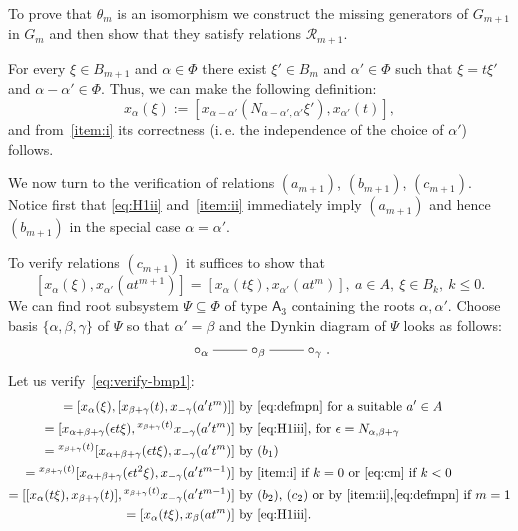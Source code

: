 \documentclass[oneside, 10pt]{amsart}
\newcommand{\RR}[1]{\mathcal{R}_{#1}}
\theoremstyle{remark}
\begin{document}
To prove that $\theta_m$ is an isomorphism we construct the missing generators of $G_{m+1}$ in $G_m$ and then show that they satisfy relations $\RR{m+1}$.

For every $\xi \in B_{m+1}$ and $\alpha\in \Phi$ there exist $\xi' \in B_m$ and $\alpha'\in \Phi$ such that $\xi = t\xi'$ and $\alpha-\alpha'\in\Phi$.
Thus, we can make the following definition:
\begin{equation} \label{eq:defmpn} x_\alpha(\xi) := [x_{\alpha-\alpha'}(N_{\alpha-\alpha',\alpha'} \xi'), x_{\alpha'}(t)],\end{equation} 
and from~\eqref{item:i} its correctness (i.\,e. the independence of the choice of $\alpha'$) follows.

We now turn to the verification of relations $(a_{m+1})$, $(b_{m+1})$, $(c_{m+1})$.
Notice first that \eqref{eq:H1ii} and~\eqref{item:ii} immediately imply $(a_{m+1})$ and hence $(b_{m+1})$ in the special case $\alpha=\alpha'$.

To verify relations $(c_{m+1})$ it suffices to show that
\begin{equation}
\label{eq:verify-bmp1} [x_\alpha(\xi), x_{\alpha'}(at^{m+1})] = [x_\alpha(t\xi), x_{\alpha'}(at^m)],\ a \in A,\ \xi \in B_k,\ k\leq 0.
\end{equation}
We can find root subsystem $\Psi \subseteq \Phi$ of type $\mathsf{A}_3$ containing the roots $\alpha, \alpha'$.
Choose basis $\{\alpha,\beta,\gamma\}$ of $\Psi$ so that $\alpha'=\beta$ and the Dynkin diagram of $\Psi$ looks as follows:
\begin{equation}\label{eq:diagA3} \xymatrix{\circ_\alpha \ar@{-}[r] & \circ_\beta \ar@{-}[r] & \circ_\gamma}.\end{equation}
Let us verify~\eqref{eq:verify-bmp1}:
\begin{align*}
   [x_\alpha(\xi), x_\beta(at^{m+1})] = [x_\alpha(\xi), [x_{\beta + \gamma}(t), x_{-\gamma}(a't^m)]]&  \text{ by~\eqref{eq:defmpn} for a suitable $a'\in A$} \\ 
 = [x_{\alpha+\beta+\gamma}(\epsilon t\xi), {}^{x_{\beta+\gamma}(t)}x_{-\gamma}(a't^m)]             &  \text{ by~\eqref{eq:H1iii}, for $\epsilon=N_{\alpha, \beta+\gamma}$} \\
 = {}^{x_{\beta+\gamma}(t)}[x_{\alpha+\beta+\gamma}(\epsilon t\xi), x_{-\gamma}(a't^m)]             &  \text{ by $(b_1)$} \\
 = {}^{x_{\beta+\gamma}(t)}[x_{\alpha+\beta+\gamma}(\epsilon t^2\xi), x_{-\gamma}(a't^{m-1})]       &  \text{ by~\eqref{item:i} if $k=0$ or~\eqref{eq:cm} if $k <0$} \\
 = [[x_\alpha(t\xi), x_{\beta+\gamma}(t)], {}^{x_{\beta+\gamma}(t)} x_{-\gamma}(a't^{m-1})]         &  \text{ by~$(b_2)$, $(c_2)$ or by~\eqref{item:ii},\eqref{eq:defmpn} if $m=1$} \\
 = [x_\alpha(t\xi), x_\beta(at^m)]                                                                  &  \text{ by~\eqref{eq:H1iii}.}
\end{align*}
\end{document}
